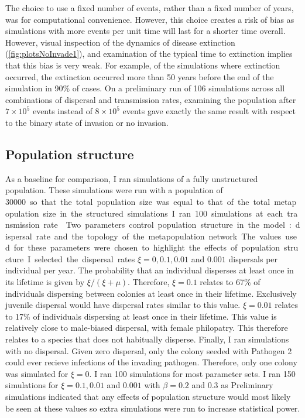 The choice to use a fixed number of events, rather than a fixed number of years, was for computational convenience.
However, this choice creates a risk of bias as simulations with more events per unit time will last for a shorter time overall.
However, visual inspection of the dynamics of disease extinction (\ref{fig:plotsNoInvade1}), and examination of the typical time to extinction implies that this bias is very weak.
For example, of the simulations where extinction occurred, the extinction occurred more than 50 years before the end of the simulation in 90\% of cases.
On a preliminary run of 106 simulations across all combinations of dispersal and transmission rates, examining the population after $7 \times 10^5$ events instead of \ensuremath{8\times 10^{5}} events gave exactly the same result with respect to the binary state of invasion or no invasion. 


\subsection{Population structure}

As a baseline for comparison, I ran simulations of a fully unstructured population.
These simulations were run with a population of \SI{30000} so that the total population size was equal to that of the total metapopulation size in the structured simulations.
I ran 100 simulations at each transmission rate.




Two parameters control population structure in the model: dispersal rate and the topology of the metapopulation network.
The values used for these parameters were chosen to highlight the effects of population structure. 
I selected the dispersal rates $\xi = 0, 0.1, 0.01$ and $ 0.001$ dispersals per individual per year. 
The probability that an individual disperses at least once in its lifetime is given by $\xi / \left(\xi + \mu\right)$.
Therefore, $\xi = 0.1$ relates to 67\% of individuals dispersing between colonies at least once in their lifetime. 
Exclusively juvenile dispersal would have dispersal rates similar to this value. %
$\xi = 0.01$ relates to 17\% of individuals dispersing at least once in their lifetime.
This value is relatively close to male-biased dispersal, with female philopatry. %
This therefore relates to a species that does not habitually disperse.
Finally, I ran simulations with no dispersal.
Given zero dispersal, only the colony seeded with Pathogen 2 could ever recieve infections of the invading pathogen.
Therefore, only one colony was simulated for $\xi = 0$.
I ran 100 simulations for most parameter sets.
I ran 150 simulations for $\xi = 0.1, 0.01$ and $0.001$ with $\beta = 0.2$ and $0.3$ as
Preliminary simulations indicated that any effects of population structure would most likely be seen at these values so extra simulations were run to increase statistical power. 



